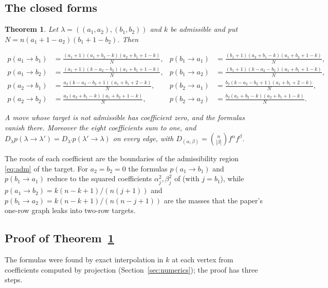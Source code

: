 \documentclass[11pt]{amsart}
\newtheorem{theorem}{Theorem}[section]
\theoremstyle{definition}
\begin{document}
\subsection{The closed forms}
\begin{theorem}\label{thm:coeff}
Let $\lambda=((a_1,a_2),(b_1,b_2))$ and $k$ be admissible and put $N=n(a_1+1-a_2)(b_1+1-b_2)$. Then
\begin{small}
\begin{equation}\label{eq:eight}
\begin{aligned}
p(a_1\to b_1)&=\frac{(a_1+1)(a_1+b_2-k)(a_2+b_1+1-k)}N, &
p(b_1\to a_1)&=\frac{(b_1+1)(a_2+b_1-k)(a_1+b_2+1-k)}N,\\
p(a_1\to b_2)&=\frac{(a_1+1)(k-a_2-b_2)(a_1+b_1+1-k)}N, &
p(b_1\to a_2)&=\frac{(b_1+1)(k-a_2-b_2)(a_1+b_1+1-k)}N,\\
p(a_2\to b_1)&=\frac{a_2(k-a_2-b_2+1)(a_1+b_1+2-k)}N, &
p(b_2\to a_1)&=\frac{b_2(k-a_2-b_2+1)(a_1+b_1+2-k)}N,\\
p(a_2\to b_2)&=\frac{a_2(a_2+b_1-k)(a_1+b_2+1-k)}N, &
p(b_2\to a_2)&=\frac{b_2(a_1+b_2-k)(a_2+b_1+1-k)}N .
\end{aligned}
\end{equation}
\end{small}
A move whose target is not admissible has coefficient zero, and the formulas vanish there. Moreover the eight coefficients sum to one, and $D_\lambda p(\lambda\to\lambda')=D_{\lambda'}p(\lambda'\to\lambda)$ on every edge, with $D_{(\alpha,\beta)}=\binom n{|\beta|}f^\alpha f^\beta$.
\end{theorem}

The roots of each coefficient are the boundaries of the admissibility region \eqref{eq:adm} of the target. For $a_2=b_2=0$ the formulas $p(a_1\to b_1)$ and $p(b_1\to a_1)$ reduce to the squared coefficients $\alpha_j^2,\beta_j^2$ of \cite[\S2]{OAI2026} (with $j=b_1$), while $p(a_1\to b_2)=k(n-k+1)/(n(j+1))$ and $p(b_1\to a_2)=k(n-k+1)/(n(n-j+1))$ are the masses that the paper's one-row graph leaks into two-row targets.

\subsection{Proof of Theorem~\ref{thm:coeff}}\label{sec:proof}
The formulas were found by exact interpolation in $k$ at each vertex from coefficients computed by projection (Section~\ref{sec:numerics}); the proof has three steps.
\end{document}
